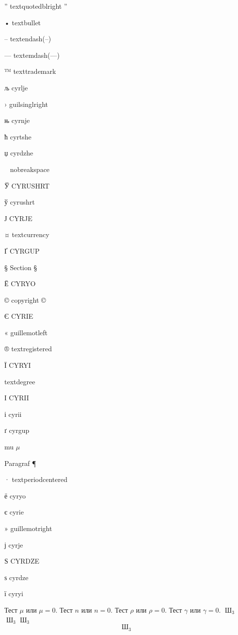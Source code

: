 \documentclass{amsart}
\begin{document}
” textquotedblright \textquotedblright

• textbullet \textbullet

– textendash(--) \textendash

— textemdash(---) \textemdash

™ texttrademark \texttrademark

љ cyrlje \cyrlje

› guilsinglright \guilsinglright

њ cyrnje \cyrnje

ћ cyrtshe \cyrtshe

џ cyrdzhe \cyrdzhe

  nobreakspace \nobreakspace

Ў CYRUSHRT \CYRUSHRT

ў cyrushrt \cyrushrt

Ј CYRJE \CYRJE

¤ textcurrency \textcurrency

Ґ CYRGUP \CYRGUP

§ Section \S

Ё CYRYO \CYRYO

© copyright \copyright

Є CYRIE \CYRIE

« guillemotleft \guillemotleft


® textregistered \textregistered

Ї CYRYI \CYRYI

 textdegree \textdegree


І CYRII \CYRII

і cyrii \cyrii

ґ cyrgup \cyrgup

 mu $\mu$

 Paragraf \P

· textperiodcentered \textperiodcentered

ё cyryo \cyryo

є cyrie \cyrie

» guillemotright \guillemotright

ј cyrje \cyrje

Ѕ CYRDZE \CYRDZE

ѕ cyrdze \cyrdze

ї cyryi \cyryi

 Тест $\mu$ или $\mu=0$. Тест $n$ или $n=0$. Тест $\rho$ или $\rho=0$. Тест 
$\gamma$ или $\gamma=0$. $\operatorname{Ш}_3$ $\operatorname{\text{Ш}}_3$ 
$\text{Ш}_3$
$$
\operatorname{\text{Ш}}_3
$$
\end{document}
